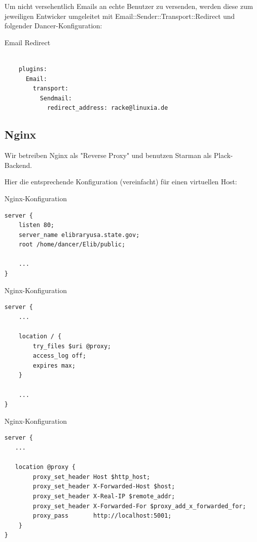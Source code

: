 Um nicht versehentlich Emails an echte Benutzer zu versenden,
werden diese zum jeweiligen Entwicker umgeleitet mit
Email::Sender::Transport::Redirect und folgender
Dancer-Konfiguration:

\begin{frame}[fragile]{Email Redirect}
\begin{lstlisting}

    plugins:
      Email:
        transport:
          Sendmail:
            redirect_address: racke@linuxia.de

\end{lstlisting}
\end{frame}

\subsection{Nginx}
    
Wir betreiben Nginx als "Reverse Proxy" und benutzen Starman als
Plack-Backend.

Hier die entsprechende Konfiguration (vereinfacht) für einen virtuellen
Host:

\begin{frame}[fragile]{Nginx-Konfiguration}
\begin{lstlisting}
server {
    listen 80;
    server_name elibraryusa.state.gov;
    root /home/dancer/Elib/public;

    ...
}
\end{lstlisting}
\end{frame}

\begin{frame}[fragile]{Nginx-Konfiguration}
\begin{lstlisting}
server {
    ...

    location / {
        try_files $uri @proxy;
        access_log off;
        expires max;
    }

    ...
}
\end{lstlisting}
\end{frame}

\begin{frame}[fragile]{Nginx-Konfiguration}
\begin{lstlisting}
server {
   ...

   location @proxy {
        proxy_set_header Host $http_host;
        proxy_set_header X-Forwarded-Host $host;
        proxy_set_header X-Real-IP $remote_addr;
        proxy_set_header X-Forwarded-For $proxy_add_x_forwarded_for;
        proxy_pass       http://localhost:5001;
    }
}
\end{lstlisting}
\end{frame}

